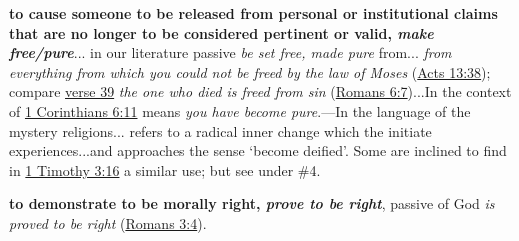 \begin{compactdesc}
\begin{compactitem}
							\item[3] \textbf{to cause someone to be released from personal or institutional claims that are no longer to be considered pertinent or valid, \textit{make free/pure}}... in our literature passive  \textit{be set free, made pure}  from... \textit{from everything from which you could not be freed by the law of Moses} (\hyperref[ACTS-13-38]{Acts 13:38}); compare \hyperref[ACTS-13-39]{verse 39}  \textit{the one who died is freed from sin} (\hyperref[ROMANS-6-7]{Romans 6:7})...In the context of \hyperref[1CORINTHIANS-6-11]{1 Corinthians 6:11}  means \textit{you have become pure}.---In the language of the mystery religions... refers to a radical inner change which the initiate experiences...and approaches the sense `become deified'. Some are inclined to find in \hyperref[1TIMOTHY-3-16]{1 Timothy 3:16} a similar use; but see under \#4.
							\item[4] \textbf{to demonstrate to be morally right, \textit{prove to be right}}, passive of God \textit{is proved to be right} (\hyperref[ROMANS-3-4]{Romans 3:4}).
						\end{compactitem}
				\end{compactdesc}
				
				
				\begin{compactdesc}
					\item[Some NT uses] \textbf{}
						\begin{compactdesc}
							\item[{\hyperref[LUKE-16-15]{Luke 16:15}}]
						\end{compactdesc}
				\end{compactdesc}
				
